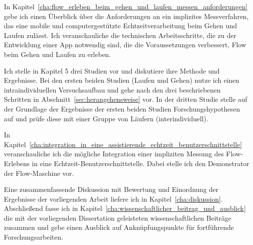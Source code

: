 In Kapitel~\ref{cha:flow_erleben_beim_gehen_und_laufen_messen_anforderungen} gebe ich einen Überblick über die Anforderungen an ein implizites Messverfahren, das eine mobile und computergestützte Echtzeitverarbeitung beim Gehen und Laufen zulässt. Ich veranschauliche die technischen Arbeitsschritte, die zu der Entwicklung einer App notwendig sind, die die Voraussetzungen verbessert, Flow beim Gehen und Laufen zu erleben.

Ich stelle in Kapitel 5 drei Studien vor und diskutiere ihre Methode und Ergebnisse. Bei den ersten beiden Studien (Laufen und Gehen) nutze ich einen intraindividuellen Versuchsaufbau und gehe nach den drei beschriebenen Schritten in Abschnitt~\ref{sec:herangehensweise} vor. In der dritten Studie stelle auf der Grundlage der Ergebnisse der ersten beiden Studien Forschungshypothesen auf und prüfe diese mit einer Gruppe von Läufern (interindividuell).

In Kapitel~\ref{cha:integration_in_eine_assistierende_echtzeit_benutzerschnittstelle} veranschauliche ich die mögliche Integration einer impliziten Messung des Flow-Erlebens in eine Echtzeit-Benutzerschnittstelle. Dabei stelle ich den Demonstrator der Flow-Maschine vor.

Eine zusammenfassende Diskussion mit Bewertung und Einordnung der Ergebnisse der vorliegenden Arbeit liefere ich in Kapitel~\ref{cha:diskussion}. Abschließend fasse ich in Kapitel~\ref{cha:wissenschaftlicher_beitrag_und_ausblick} die mit der vorliegenden Dissertation geleisteten wissenschaftlichen Beiträge zusammen und gebe einen Ausblick auf Anknüpfungspunkte für fortführende Forschungsarbeiten.

